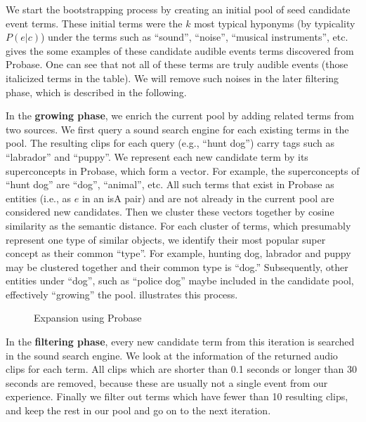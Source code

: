 We start the bootstrapping process by creating an initial pool of
seed candidate event terms. These initial terms were the $k$ most typical
hyponyms (by typicality $P(e | c)$)
under the terms such as ``sound'', ``noise'', ``musical instruments'',
etc.   gives the some examples of these candidate audible events 
terms discovered from Probase. One can see that not all of these terms
are truly audible events (those italicized terms in the table). 
We will remove such noises in the later filtering phase, which is described
in the following.

In the {\bf growing phase}, we enrich the current pool by adding related terms
from two sources. We first query a sound search engine
for each existing terms in the pool. The resulting clips for each query
(e.g., ``hunt dog'') carry tags such as ``labrador'' and ``puppy''. 
We represent each new candidate term by its superconcepts in Probase, 
which form a vector. For example, the superconcepts of ``hunt dog'' are 
``dog'', ``animal'', etc. All such terms that exist in Probase as entities 
(i.e., as $e$ in an isA pair) and are not already in the current pool 
are considered new candidates. 
Then we cluster these vectors together by cosine similarity as 
the semantic distance. For each cluster of terms, which presumably 
represent one type of similar objects, we identify their most popular 
super concept as their common ``type''. For example, hunting
dog, labrador and puppy may be clustered together and their common type 
is ``dog.''  Subsequently, other entities under ``dog'', such as 
``police dog'' maybe included in the candidate pool, effectively ``growing'' 
the pool.
 illustrates this process.

\begin{figure}[th]
\centering
{}
\caption{Expansion using Probase}
\label{fig:expand}
\end{figure}

In the {\bf filtering phase}, every new candidate term from this iteration
is searched in the sound search engine. We look at the information of the
returned audio clips for each term. All clips which are shorter than 0.1 seconds
or longer than 30 seconds are removed, because these are usually not a single
event from our experience. Finally we filter out terms which have
fewer than 10 resulting clips, and keep the rest in our pool and go on to
the next iteration. 

